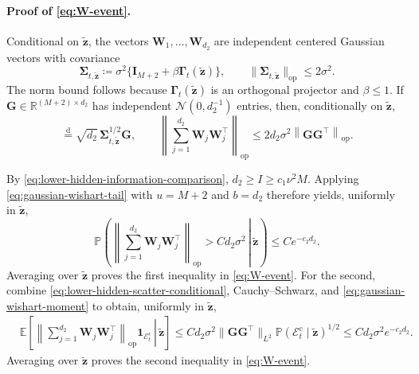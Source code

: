 \documentclass[11pt]{article}
\newcommand{\trans}{\top}
\newcommand{\op}{\mathrm{op}}
\newcommand{\opn}[1]{\left\lVert #1\right\rVert_{\mathrm{op}}}
\begin{document}
\paragraph{Proof of \cref{eq:W-event}.}
Conditional on $\widetilde{\bm z}$, the vectors
$\bm W_1,\ldots,\bm W_{d_2}$ are independent centered Gaussian vectors with
covariance
\begin{equation}
  \bm\Sigma_{t,\widetilde{\bm z}}
  \coloneqq
  \sigma^2\{\bm I_{M+2}+\beta\bm\Gamma_t(\widetilde{\bm z})\},
  \qquad
  \|\bm\Sigma_{t,\widetilde{\bm z}}\|_{\mathrm{op}}
  \le2\sigma^2.
\label{eq:lower-hidden-conditional-covariance}
\end{equation}
The norm bound follows because $\bm\Gamma_t(\widetilde{\bm z})$ is an
orthogonal projector and $\beta\le1$.  If
$\bm G\in\mathbb R^{(M+2)\times d_2}$ has independent
$\mathcal N(0,d_2^{-1})$ entries, then, conditionally on
$\widetilde{\bm z}$,
\begin{equation}
  [\bm W_1,\ldots,\bm W_{d_2}]
  \overset{\mathrm d}{=}
  \sqrt{d_2}\,\bm\Sigma_{t,\widetilde{\bm z}}^{1/2}\bm G,
  \qquad
  \left\|\sum_{j=1}^{d_2}\bm W_j\bm W_j^\trans\right\|_{\op}
  \le
  2d_2\sigma^2\opn{\bm G\bm G^\trans}.
\label{eq:lower-hidden-scatter-conditional}
\end{equation}

By \cref{eq:lower-hidden-information-comparison},
$d_2\ge I\ge c_1\nu^2M$.  Applying
\cref{eq:gaussian-wishart-tail} with $u=M+2$ and $b=d_2$ therefore yields,
uniformly in $\widetilde{\bm z}$,
\begin{equation}
  \mathbb P\left(
    \left.
    \left\|\sum_{j=1}^{d_2}\bm W_j\bm W_j^\trans\right\|_{\op}
    >Cd_2\sigma^2
    \,\right|\,
    \widetilde{\bm z}
  \right)
  \le
  Ce^{-c_2d_2}.
\label{eq:lower-hidden-scatter-tail}
\end{equation}
Averaging over $\widetilde{\bm z}$ proves the first inequality in
\cref{eq:W-event}.  For the second, combine
\cref{eq:lower-hidden-scatter-conditional}, Cauchy--Schwarz, and
\cref{eq:gaussian-wishart-moment} to obtain, uniformly in
$\widetilde{\bm z}$,
\begin{align*}
  &\mathbb E\left[
    \left.
    \left\|\sum_{j=1}^{d_2}\bm W_j\bm W_j^\trans\right\|_{\op}
    \bm1_{\mathcal E_t^c}
    \,\right|\,
    \widetilde{\bm z}
  \right]\le
  Cd_2\sigma^2
  \|\bm G\bm G^\trans\|_{L^2}
  \mathbb P(\mathcal E_t^c\mid\widetilde{\bm z})^{1/2}
  \le
  Cd_2\sigma^2e^{-c_2d_2}.
\end{align*}
Averaging over $\widetilde{\bm z}$ proves the second inequality in
\cref{eq:W-event}.
\end{document}
